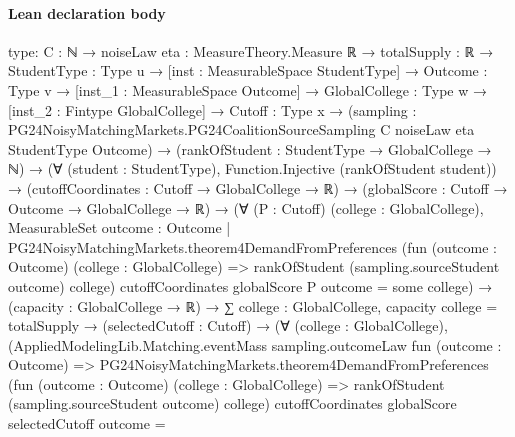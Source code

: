 \documentclass[10pt]{article}
\begin{document}
\paragraph{Lean declaration body}
\begin{ReviewVerbatim}
type:
{C : ℕ} →
  {noiseLaw eta : MeasureTheory.Measure ℝ} →
    {totalSupply : ℝ} →
      {StudentType : Type u} →
        [inst : MeasurableSpace StudentType] →
          {Outcome : Type v} →
            [inst_1 : MeasurableSpace Outcome] →
              {GlobalCollege : Type w} →
                [inst_2 : Fintype GlobalCollege] →
                  {Cutoff : Type x} →
                    (sampling :
                        PG24NoisyMatchingMarkets.PG24CoalitionSourceSampling C noiseLaw eta StudentType Outcome) →
                      (rankOfStudent : StudentType → GlobalCollege → ℕ) →
                        (∀ (student : StudentType), Function.Injective (rankOfStudent student)) →
                          (cutoffCoordinates : Cutoff → GlobalCollege → ℝ) →
                            (globalScore : Cutoff → Outcome → GlobalCollege → ℝ) →
                              (∀ (P : Cutoff) (college : GlobalCollege),
                                  MeasurableSet
                                    {outcome : Outcome |
                                      PG24NoisyMatchingMarkets.theorem4DemandFromPreferences
                                          (fun (outcome : Outcome) (college : GlobalCollege) =>
                                            rankOfStudent (sampling.sourceStudent outcome) college)
                                          cutoffCoordinates globalScore P outcome =
                                        some college}) →
                                (capacity : GlobalCollege → ℝ) →
                                  ∑ college : GlobalCollege, capacity college = totalSupply →
                                    (selectedCutoff : Cutoff) →
                                      (∀ (college : GlobalCollege),
                                          (AppliedModelingLib.Matching.eventMass sampling.outcomeLaw
                                              fun (outcome : Outcome) =>
                                              PG24NoisyMatchingMarkets.theorem4DemandFromPreferences
                                                  (fun (outcome : Outcome) (college : GlobalCollege) =>
                                                    rankOfStudent (sampling.sourceStudent outcome) college)
                                                  cutoffCoordinates globalScore selectedCutoff outcome =

\end{ReviewVerbatim}
\end{document}
